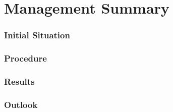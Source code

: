 \part{Management Summary}

\section{Initial Situation}

\section{Procedure}

\section{Results}

\section{Outlook}